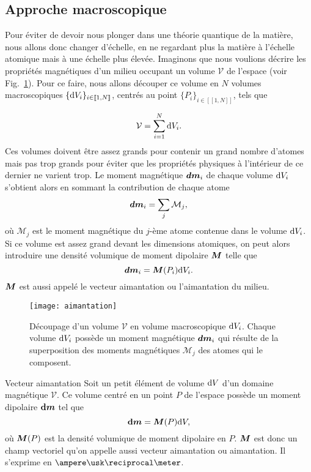 \subsection{Approche macroscopique}
Pour éviter de devoir nous plonger dans une théorie quantique de la matière, nous
allons donc changer d'échelle, en ne regardant plus la matière à l'échelle atomique
mais à une échelle plus élevée. Imaginons que nous voulions décrire les propriétés magnétiques d'un milieu occupant un volume $\mathcal{V}$ de l'espace (voir Fig.~\ref{fig:aimantation}). 
Pour ce faire, nous allons découper
ce volume en $N$ volumes macroscopiques $\{\mathrm{d}V_i\}_{i \in [\![1,N]\!]}$, centrés 
au point $\{P_i\}_{i \in [\![1,N]\!]}$, 
tels que 

\begin{equation*}
\mathcal{V} = \sum_{i = 1}^N \mathrm{d}V_i. 
\end{equation*}
Ces volumes doivent être assez grands 
pour contenir un grand nombre d'atomes mais pas trop grands pour éviter 
que les propriétés physiques à l'intérieur de ce dernier ne varient trop.
Le moment magnétique $\vecd\vecm_i$ 
de chaque volume $\mathrm{d}V_i$ s'obtient alors en sommant la contribution de chaque atome
\begin{equation*}
	\vecd\vecm_i = \sum_j \mathcal{M}_j,
\end{equation*}
où $\mathcal{M}_j$ est le moment magnétique du $j$-ème atome contenue dans 
le volume $\mathrm{d}V_i$.
Si ce volume est assez grand devant les dimensions atomiques, on peut alors
introduire une densité volumique de moment dipolaire $\vecM$ telle que
\begin{equation*}
	\vecd\vecm_i = \vecM(P_i) \dV_i.
\end{equation*}
$\vecM$ est aussi appelé le vecteur aimantation ou l'aimantation du milieu.

\begin{figure}[]
	\centering
	\texttt{[image: aimantation]}
	\caption{Découpage d'un volume $\mathcal{V}$ en volume macroscopique
	$\mathrm{d}V_i$. Chaque volume $\mathrm{d}V_i$ possède un moment magnétique $\vecd\vecm_i$
	qui résulte de la superposition des moments magnétiques $\mathcal{M}_j$
	des atomes qui le composent.}%
	\label{fig:aimantation}
\end{figure}

\begin{defn}{Vecteur aimantation}
	Soit un petit élément de volume $\mathrm{d}V$ d'un domaine magnétique $\mathcal{V}$.
	Ce volume centré en un point $P$ de l'espace 
	possède un moment dipolaire $\mathrm{\textbf{d}}\vecm$ tel que
	\begin{equation}
		\mathrm{\textbf{d}}\vecm = \vecM(P) \dV,
	\end{equation}
	où $\vecM(P)$ est la densité volumique de moment dipolaire en $P$.
	$\vecM$ est donc un champ vectoriel qu'on appelle aussi vecteur aimantation
	ou aimantation.
	Il s'exprime en $\ampere \usk \reciprocal \meter$.
\end{defn}

